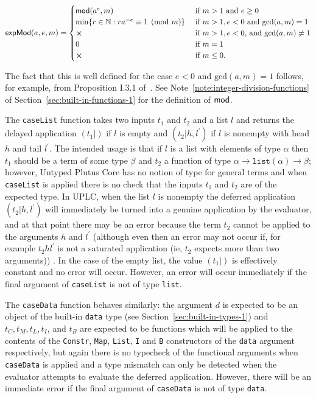 $$
\mathsf{expMod}(a,e,m) =
  \begin{cases}
     \modfn(a^e,m) & \text{if $m > 1$ and $e \geq 0$}\\
     \min\{r \in \N: ra^{-e} \equiv 1\pmod{m}\}\  & \text{if $m > 1, e < 0$ and $\mathrm{gcd}(a,m) = 1$}\\
     \errorX & \text{if $m>1,e<0$, and $\mathrm{gcd}(a,m) \neq 1$}\\
     0 & \text{if $m=1$}\\
     \errorX & \text{if $m \leq 0$.}
  \end{cases}
$$ 

\noindent The fact that this is well defined for the case $e<0$ and $\mathrm{gcd}(a,m) = 1$
follows, for example, from Proposition I.3.1 of~\cite{Koblitz-GTM}.  See
Note~\ref{note:integer-division-functions} of
Section~\ref{sec:built-in-functions-1} for the definition of $\operatorname{\mathsf{mod}}$.

\label{note:case-list-case-data}
The \texttt{caseList} function takes two inputs $t_1$ and $t_2$ and a list $l$
and returns the delayed application $(t_1|)$ if $l$ is empty and
$(t_2|h,l^{\prime})$ if $l$ is nonempty with head $h$ and tail $l^{\prime}$.
The intended usage is that if $l$ is a list with elements of type $\alpha$ then
$t_1$ should be a term of some type $\beta$ and $t_2$ a function of type
$\alpha \rightarrow
\mathtt{list}(\alpha) \rightarrow \beta$; however, Untyped Plutus Core has no notion
of type for general terms and when \texttt{caseList} is applied there is no
check that the inputs $t_1$ and $t_2$ are of the expected type.  In UPLC, when
the list $l$ is nonempty the deferred application $(t_2|h,l^{\prime})$ will
immediately be turned into a genuine application by the evaluator, and at that
point there may be an error because the term $t_2$ cannot be applied to the
arguments $h$ and $l^{\prime}$ (although even then an error may not occur if,
for example $t_2 h l^{\prime}$ is not a saturated application (ie, $t_2$ expects
more than two arguments)) .  In the case of the empty list, the value $(t_1|)$
is effectively constant and no error will occur.  However, an error will occur
immediately if the final argument of \texttt{caseList} is not of
type \texttt{list}.

The \texttt{caseData} function behaves similarly: the argument $d$ is expected
to be an object of the built-in \texttt{data} type (see
Section~\ref{sec:built-in-types-1}) and $t_C, t_M, t_L, t_I$, and $t_B$ are
expected to be functions which will be applied to the contents of
the \texttt{Constr}, \texttt{Map}, \texttt{List}, \texttt{I} and \texttt{B}
constructors of the \texttt{data} argument respectively, but again there is no
typecheck of the functional arguments when \texttt{caseData} is applied and a
type mismatch can only be detected when the evaluator attempts to evaluate the
deferred application.  However, there will be an immediate error if the final
argument of \texttt{caseData} is not of type \texttt{data}.




